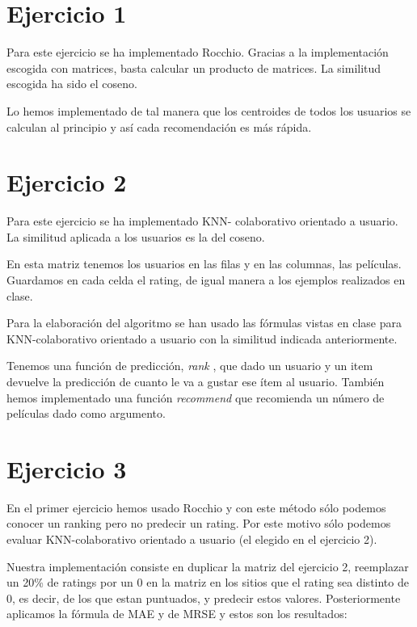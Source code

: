 \documentclass[palatino]{apuntes}
\begin{document}
\section{Ejercicio 1}

	Para este ejercicio se ha implementado Rocchio.
	Gracias a la implementación escogida con matrices, basta calcular un producto de matrices.
	La similitud escogida ha sido el coseno.
	
	Lo hemos implementado de tal manera que los centroides de todos los usuarios se calculan al principio y así cada recomendación es más rápida.
	



\section{Ejercicio 2}

	Para este ejercicio se ha implementado KNN- colaborativo orientado a usuario. 
	La similitud aplicada a los usuarios es la del coseno.

 	En esta matriz tenemos los usuarios en las filas y en las columnas, las películas. 
 	Guardamos en cada celda el rating, de igual manera a los ejemplos realizados en clase.

 	Para la elaboración del algoritmo se han usado las fórmulas vistas en clase para KNN-colaborativo orientado a usuario con la similitud indicada anteriormente.

 	Tenemos una función de predicción, \textit{rank} , que dado un usuario y un item devuelve la predicción de cuanto le va a gustar ese ítem al usuario.
  	También hemos implementado una función \textit{recommend} que recomienda un número de películas dado como argumento.


\section{Ejercicio 3}

   En el primer ejercicio hemos usado Rocchio y con este método sólo podemos conocer un ranking pero no predecir un rating. 
   Por este motivo sólo podemos evaluar KNN-colaborativo orientado a usuario (el elegido en el ejercicio 2).

   Nuestra implementación consiste en duplicar la matriz del ejercicio 2, reemplazar un 20\% de ratings por un 0 en la matriz  en los sitios que el rating sea distinto de 0, es decir, de los que estan puntuados, y predecir estos valores.
   Posteriormente aplicamos la fórmula de MAE y de MRSE y estos son los resultados:
\end{document}
